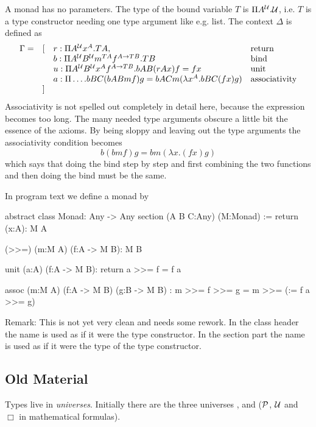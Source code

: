 A monad has no parameters. The type of the bound variable $T$ is $\Pi
A^{\cal{U}}. {\cal{U}}$, i.e. $T$ is a type constructor needing one type argument like
e.g. list.  The context $\Delta$ is defined as
$$
\begin{array}{llll}
  \Gamma =
  &[
  & r: \Pi A^{\cal{U}} x^A. T A,
  & \text{return}
  \\
  &
  & b: \Pi A^{\cal{U}} B^{\cal{U}} m^{T A} f^{A\to T B}. T B
  & \text{bind}
  \\
  &
  & u: \Pi A^{\cal{U}} B^{\cal{U}} x^A f^{A\to T B}. b A B (r A x) f = f x
  & \text{unit}
  \\
  &
  & a: \Pi \ldots . b B C (b A B m f) g = b A C m (\lambda x^A. b B C (f x) g)
  & \text{associativity}
  \\
  &]
\end{array}
$$
Associativity is not spelled out completely in detail here, because the
expression becomes too long. The many needed type arguments obscure a little
bit the essence of the axioms. By being sloppy and leaving out the type
arguments the associativity condition becomes
$$
  b (b m f) g = b m (\lambda x. (f x) g)
$$
which says that doing the bind step by step and first combining the two
functions and then doing the bind must be the same.

In program text we define a monad by
\begin{alba}
   abstract class
     Monad: Any -> Any
   section (A B C:Any) (M:Monad) :=
     return (x:A): M A

     (>>=) (m:M A) (f:A -> M B): M B

     unit (a:A) (f:A -> M B): return a >>= f = f a

     assoc (m:M A)
           (f:A -> M B)
           (g:B -> M B)
           : m >>= f >>= g  =  m >>= (\a := f a >>= g)
\end{alba}

Remark: This is not yet very clean and needs some rework. In the class header
the name  is used as if it were the type constructor. In the
section part the name is used as if it were the type of the type constructor.




\subsection{Old Material}

Types live in \emph{universes}. Initially there are the three universes
,  and  (${\cal{P}}$, ${\cal{U}}$ and $\Box$ in
mathematical formulas).

